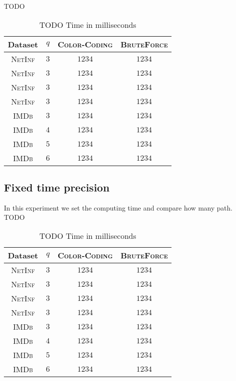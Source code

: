 	TODO
	\begin{table}[h]
		\centering
		\label{my-label}
		\begin{tabular}{|c|c|c|c|}
			\hline
			Dataset 		& $q$ & \textsc{Color-Coding} 	& \textsc{BruteForce} \\ \hline
			\textsc{NetInf}	& $3$ & $1234$					& $1234$ \\ \hline
			\textsc{NetInf}	& $3$ & $1234$					& $1234$ \\ \hline
			\textsc{NetInf}	& $3$ & $1234$					& $1234$ \\ \hline
			\textsc{NetInf}	& $3$ & $1234$					& $1234$ \\ \hline
			\textsc{IMDb}	& $3$ & $1234$					& $1234$ \\ \hline
			\textsc{IMDb}	& $4$ & $1234$					& $1234$ \\ \hline
			\textsc{IMDb}	& $5$ & $1234$					& $1234$ \\ \hline
			\textsc{IMDb}	& $6$ & $1234$					& $1234$ \\ \hline
		\end{tabular}
		\caption{TODO Time in milliseconds}
	\end{table}
	
	\subsection*{Fixed time precision}
	
	In this experiment we set the computing time and compare how many path.\\
	
	TODO
	\begin{table}[h]
		\centering
		\label{my-label}
		\begin{tabular}{|c|c|c|c|}
			\hline
			Dataset 		& $q$ & \textsc{Color-Coding} 	& \textsc{BruteForce} \\ \hline
			\textsc{NetInf}	& $3$ & $1234$					& $1234$ \\ \hline
			\textsc{NetInf}	& $3$ & $1234$					& $1234$ \\ \hline
			\textsc{NetInf}	& $3$ & $1234$					& $1234$ \\ \hline
			\textsc{NetInf}	& $3$ & $1234$					& $1234$ \\ \hline
			\textsc{IMDb}	& $3$ & $1234$					& $1234$ \\ \hline
			\textsc{IMDb}	& $4$ & $1234$					& $1234$ \\ \hline
			\textsc{IMDb}	& $5$ & $1234$					& $1234$ \\ \hline
			\textsc{IMDb}	& $6$ & $1234$					& $1234$ \\ \hline
		\end{tabular}
		\caption{TODO Time in milliseconds}
	\end{table}

